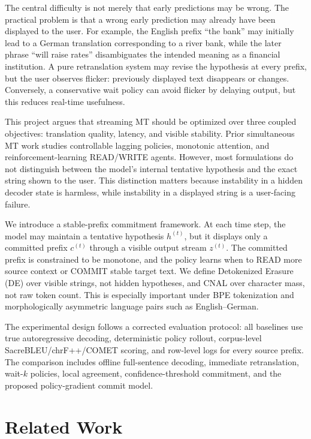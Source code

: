 \documentclass[conference]{IEEEtran}
\begin{document}
The central difficulty is not merely that early predictions may be wrong. The practical problem is that a wrong early prediction may already have been displayed to the user. For example, the English prefix ``the bank'' may initially lead to a German translation corresponding to a river bank, while the later phrase ``will raise rates'' disambiguates the intended meaning as a financial institution. A pure retranslation system may revise the hypothesis at every prefix, but the user observes flicker: previously displayed text disappears or changes. Conversely, a conservative wait policy can avoid flicker by delaying output, but this reduces real-time usefulness.

This project argues that streaming MT should be optimized over three coupled objectives: translation quality, latency, and visible stability. Prior simultaneous MT work studies controllable lagging policies, monotonic attention, and reinforcement-learning READ/WRITE agents. However, most formulations do not distinguish between the model's internal tentative hypothesis and the exact string shown to the user. This distinction matters because instability in a hidden decoder state is harmless, while instability in a displayed string is a user-facing failure.

We introduce a stable-prefix commitment framework. At each time step, the model may maintain a tentative hypothesis $h^{(t)}$, but it displays only a committed prefix $c^{(t)}$ through a visible output stream $z^{(t)}$. The committed prefix is constrained to be monotone, and the policy learns when to READ more source context or COMMIT stable target text. We define Detokenized Erasure (DE) over visible strings, not hidden hypotheses, and CNAL over character mass, not raw token count. This is especially important under BPE tokenization and morphologically asymmetric language pairs such as English--German.

The experimental design follows a corrected evaluation protocol: all baselines use true autoregressive decoding, deterministic policy rollout, corpus-level SacreBLEU/chrF++/COMET scoring, and row-level logs for every source prefix. The comparison includes offline full-sentence decoding, immediate retranslation, wait-$k$ policies, local agreement, confidence-threshold commitment, and the proposed policy-gradient commit model.

\section{Related Work}
\end{document}
